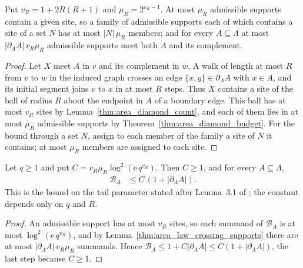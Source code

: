 \begin{lemma}
    \label{thm:area_law_crossing_supports}
    \leanok
    Put $v_R=1+2R(R+1)$ and $\mu_R=2^{v_R-1}$. At most $\mu_R$ admissible
    supports contain a given site, so a family of admissible supports each of
    which contains a site of a set $N$ has at most $|N|\,\mu_R$ members; and
    for every $A\subseteq\Lambda$ at most
    $|\partial_\Lambda A|\,v_R\mu_R$ admissible supports meet both $A$ and its
    complement.
\end{lemma}
\begin{proof}\leanok
    Let $X$ meet $A$ in $v$ and its complement in $w$. A walk of length at
    most $R$ from $v$ to $w$ in the induced graph crosses an edge
    $\{x,y\}\in\partial_\Lambda A$ with $x\in A$, and its initial segment
    joins $v$ to $x$ in at most $R$ steps. Thus $X$ contains a site of the
    ball of radius $R$ about the endpoint in $A$ of a boundary edge. This
    ball has at most $v_R$ sites by Lemma~\ref{thm:area_diamond_count}, and
    each of them lies in at most $\mu_R$ admissible supports by
    Theorem~\ref{thm:area_diamond_budget}. For the bound through a set $N$,
    assign to each member of the family a site of $N$ it contains; at most
    $\mu_R$ members are assigned to each site.
\end{proof}

\begin{lemma}
    \label{thm:area_law_tail_parameter}
    \leanok
    Let $q\ge1$ and put $C=v_R\mu_R\log^2(\mathrm e\,q^{v_R})$. Then $C\ge1$,
    and for every $A\subseteq\Lambda$,
    \begin{align}
        \mathcal B_A & \le C\,(1+|\partial_\Lambda A|).
        \label{eq:area_law_tail_parameter}
    \end{align}
    This is the bound on the tail parameter stated after Lemma~3.1 of
    \cite{OpenAI2026AreaLaw}; the constant depends only on $q$ and $R$.
\end{lemma}
\begin{proof}\leanok
    An admissible support has at most $v_R$ sites, so each summand of
    $\mathcal B_A$ is at most $\log^2(\mathrm e\,q^{v_R})$, and by
    Lemma~\ref{thm:area_law_crossing_supports} there are at most
    $|\partial_\Lambda A|\,v_R\mu_R$ summands. Hence
    $\mathcal B_A\le1+C|\partial_\Lambda A|\le C(1+|\partial_\Lambda A|)$,
    the last step because $C\ge1$.
\end{proof}

